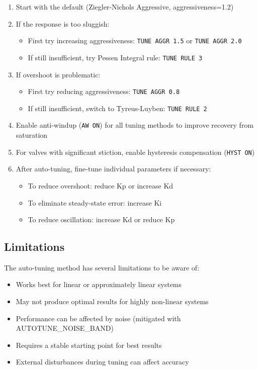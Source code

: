 \documentclass[a4paper,11pt]{article}
\begin{document}
\begin{enumerate}
    \item Start with the default (Ziegler-Nichols Aggressive, aggressiveness=1.2)
    \item If the response is too sluggish:
    \begin{itemize}
        \item First try increasing aggressiveness: \texttt{TUNE AGGR 1.5} or \texttt{TUNE AGGR 2.0}
        \item If still insufficient, try Pessen Integral rule: \texttt{TUNE RULE 3}
    \end{itemize}
    \item If overshoot is problematic:
    \begin{itemize}
        \item First try reducing aggressiveness: \texttt{TUNE AGGR 0.8}
        \item If still insufficient, switch to Tyreus-Luyben: \texttt{TUNE RULE 2}
    \end{itemize}
    \item Enable anti-windup (\texttt{AW ON}) for all tuning methods to improve recovery from saturation
    \item For valves with significant stiction, enable hysteresis compensation (\texttt{HYST ON})
    \item After auto-tuning, fine-tune individual parameters if necessary:
    \begin{itemize}
        \item To reduce overshoot: reduce Kp or increase Kd
        \item To eliminate steady-state error: increase Ki
        \item To reduce oscillation: increase Kd or reduce Kp
    \end{itemize}
\end{enumerate}

\subsection{Limitations}

The auto-tuning method has several limitations to be aware of:

\begin{itemize}
    \item Works best for linear or approximately linear systems
    \item May not produce optimal results for highly non-linear systems
    \item Performance can be affected by noise (mitigated with AUTOTUNE\_NOISE\_BAND)
    \item Requires a stable starting point for best results
    \item External disturbances during tuning can affect accuracy
\end{itemize}
\end{document}
